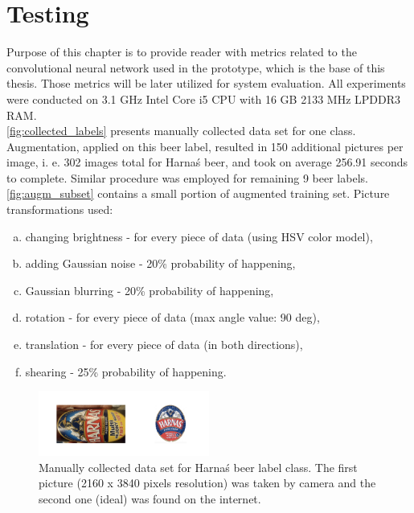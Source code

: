 \documentclass[11pt, a4paper]{article}
\begin{document}
\section{Testing} \label{testing}
Purpose of this chapter is to provide reader with metrics related to the convolutional neural network used in the prototype, which is the base of this thesis. Those metrics will be later utilized for system evaluation. All experiments were conducted on 3.1 GHz Intel Core i5 CPU with 16 GB 2133 MHz LPDDR3 RAM.\\

\autoref{fig:collected_labels} presents manually collected data set for one class. Augmentation, applied on this beer label, resulted in 150 additional pictures per image, i. e. 302 images total for \foreignlanguage{polish}{Harnaś} beer, and took on average 256.91 seconds to complete. Similar procedure was employed for remaining 9 beer labels. \autoref{fig:augm_subset} contains a small portion of augmented training set. Picture transformations used:
\begin{enumerate}[a)]
\item changing brightness - for every piece of data (using HSV color model),
\item adding Gaussian noise - 20\% probability of happening,
\item Gaussian blurring - 20\% probability of happening,
\item rotation - for every piece of data (max angle value: 90 deg),
\item translation - for every piece of data (in both directions),
\item shearing - 25\% probability of happening.
\end{enumerate}

\begin{figure}[h]
\includegraphics[width=0.5\textwidth]{collected_labels}
\centering
\caption[Ręcznie zebrany zbiór zdjęć]{Manually collected data set for \foreignlanguage{polish}{Harnaś} beer label class. The first picture (2160 x 3840 pixels resolution) was taken by camera and the second one (ideal) was found on the internet.}
\label{fig:collected_labels}
\end{figure}
\end{document}
